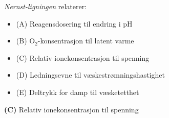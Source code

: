 

{\it Nernst-ligningen} relaterer:

\begin{itemize}
\item{(A)} Reagensdosering til endring i pH
\vskip 5pt 
\item{(B)} O$_{2}$-konsentrasjon til latent varme
\vskip 5pt 
\item{(C)} Relativ ionekonsentrasjon til spenning
\vskip 5pt 
\item{(D)} Ledningsevne til væskestrømningshastighet
\vskip 5pt 
\item{(E)} Deltrykk for damp til væsketetthet
\end{itemize}







{\bf (C)} Relativ ionekonsentrasjon til spenning 
 







